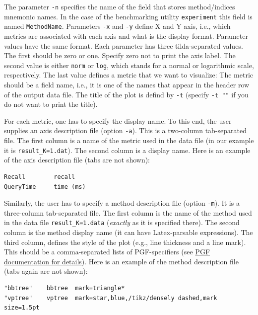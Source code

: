 \documentclass[runningheads,a4paper]{llncs}
\newcommand{\ttt}[1]{\texttt{#1}}
\begin{document}
{The parameter \ttt{-n} specifies the name of the field that stores method/indices mnemonic names.
In the case of the benchmarking utility \ttt{experiment} this field is named \ttt{MethodName}.
Parameters \ttt{-x} and \ttt{-y} define  X and Y axis, i.e.,
which metrics are associated with each axis and what is the display format.
Parameter values have the same format.
Each parameter has three tilda-separated values. The first should
be zero or one.
Specify zero not to print the axis label.
The second value is either \ttt{norm} or \ttt{log}, 
which stands for a normal or logarithmic scale, respectively.
The last value defines a metric that we want to visualize:
The metric should be a field name, i.e.,
it is one of the names that appear in the header row of the output data file.
The title of the plot is defind by \ttt{-t} (specify \ttt{-t ""} if you do not want
to print the title).

For each metric, one has to specify the display name. To this end, the user supplies
an axis description file (option \ttt{-a}). This is a two-column tab-separated file.
The first column is a name of the metric used in the data file (in our example it is \ttt{result\_K=1.dat}).
The second column is a display name. Here is an example of the axis description file (tabs are not shown):
\begin{verbatim}
Recall        recall 
QueryTime     time (ms)
\end{verbatim}

Similarly, the user has to specify a method description file (option \ttt{-m}).
It is a three-column tab-separated file. The first column is the name of the method
used in the data file \ttt{result\_K=1.data} (\emph{exactly} as it is specified there).
The second column is the method display name (it can have Latex-parsable expressions). 
The third column, defines the style of the plot (e.g., line thickness and a line mark). 
This should be a comma-separated lists of PGF-specifiers 
(see \href{http://ftp.fau.de/ctan/graphics/pgf/base/doc/pgfmanual.pdf}{PGF documentation for details}).
Here is an example of the method description file (tabs again are not shown):
\begin{verbatim}
"bbtree"	bbtree	mark=triangle*
"vptree"	vptree	mark=star,blue,/tikz/densely dashed,mark size=1.5pt
\end{verbatim}

}
\end{document}
